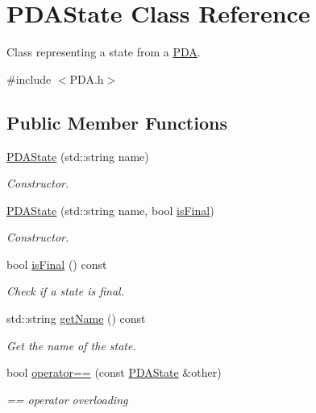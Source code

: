 \hypertarget{class_p_d_a_state}{\section{P\-D\-A\-State Class Reference}
\label{class_p_d_a_state}
}


Class representing a state from a \hyperlink{class_p_d_a}{P\-D\-A}.  




{\ttfamily \#include $<$P\-D\-A.\-h$>$}

\subsection*{Public Member Functions}
\begin{DoxyCompactItemize}
\item 
\hyperlink{class_p_d_a_state_a23a8145588cdb3d637009cde2772b231}{P\-D\-A\-State} (std\-::string name)
\begin{DoxyCompactList}\small\item\em Constructor. \end{DoxyCompactList}\item 
\hyperlink{class_p_d_a_state_a22f60087f927a3f6eec2d32d399a3a59}{P\-D\-A\-State} (std\-::string name, bool \hyperlink{class_p_d_a_state_a2d0b019768390195609cb86c774012e3}{is\-Final})
\begin{DoxyCompactList}\small\item\em Constructor. \end{DoxyCompactList}\item 
bool \hyperlink{class_p_d_a_state_a2d0b019768390195609cb86c774012e3}{is\-Final} () const 
\begin{DoxyCompactList}\small\item\em Check if a state is final. \end{DoxyCompactList}\item 
std\-::string \hyperlink{class_p_d_a_state_adc47d2550f6febc18e67a19e951063ce}{get\-Name} () const 
\begin{DoxyCompactList}\small\item\em Get the name of the state. \end{DoxyCompactList}\item 
bool \hyperlink{class_p_d_a_state_a4f82e8ecf6c1cff3c255c647302a43b5}{operator==} (const \hyperlink{class_p_d_a_state}{P\-D\-A\-State} \&other)
\begin{DoxyCompactList}\small\item\em == operator overloading \end{DoxyCompactList}\end{DoxyCompactItemize}
